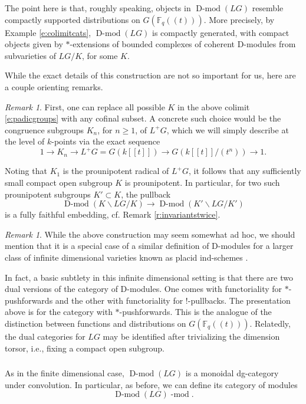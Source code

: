 \documentclass[10pt]{amsart}
\newcommand{\Fqt}{\Fq(\!(t)\!)}
\newcommand{\on}{\operatorname}
\renewcommand{\mod}{\on{-mod}}
\newcommand{\Dmod}{\on{D-mod}}
\newcommand{\Fq}{\mathbb{F}_q}
\theoremstyle{remark}
\newtheorem{re}[subsubsection]{Remark}
\numberwithin{equation}{section}
\renewcommand{\mod}{\operatorname{-mod}}
\begin{document}
	The point here is that, roughly speaking, objects in 
	$\Dmod(LG)$ resemble compactly supported distributions on $G(\Fqt)$. More 
	precisely, by Example \ref{e:colimitcats}, $\Dmod(LG)$ is compactly 
	generated, with compact objects given by $*$-extensions of bounded 
	complexes of coherent D-modules from subvarieties of $LG/K$, for some $K$. 
	
	
	While the exact details of this construction are not so important for us, here are a couple orienting remarks. 
	
	\begin{re}First, one can replace all possible $K$ in the above colimit \eqref{e:padicgroups} with 
	any cofinal subset. A concrete such choice would be the congruence 
	subgroups $K_n$, for $n \geqslant 1$, of $L^+G$, which we will simply 
	describe at the level of 
	$k$-points via the exact sequence 
		\[
		      1 \rightarrow K_n \rightarrow L^+G = G(k[[t]]) \rightarrow 
		      G(k[[t]]/(t^n)) \rightarrow 1. 
		\]
		
	Noting that $K_1$ is the prounipotent radical of $L^+G$, it follows that 
	any sufficiently small compact open subgroup $K$ is 
	prounipotent. In particular, for two such prounipotent subgroups $K' \subset K$, the 
	pullback 
	\[
	    \Dmod(K \backslash LG / K) \rightarrow \Dmod(K' \backslash LG / K')
	\]
	is a fully faithful embedding, cf. Remark \ref{r:invariantstwice}. 
	\end{re}
	
	
	
	\begin{re}While the above construction may seem somewhat ad hoc, we should 
	mention that it is a special case of a similar definition of D-modules for 
	a larger 
	class of infinite dimensional varieties known as placid ind-schemes \cite{rdm}.
	
	In fact, a basic subtlety in this infinite dimensional setting is that there are two dual versions of the category of D-modules. One comes with functoriality for $*$-pushforwards and the other with functoriality for $!$-pullbacks. The presentation above is for the category with $*$-pushforwards. This is the analogue of the distinction between functions and distributions on $G(\Fqt)$. Relatedly, the dual categories for $LG$ may be identified after trivializing the dimension torsor, i.e., fixing a compact open subgroup. 
	\end{re}
	
	
	
	\subsubsection{} As in the finite dimensional case, $\Dmod(LG)$ is a 
	monoidal dg-category under convolution. In particular, as before, we can 
	define its category of modules 
	\[
      \Dmod(LG)\mod.
	\]
	
\end{document}
